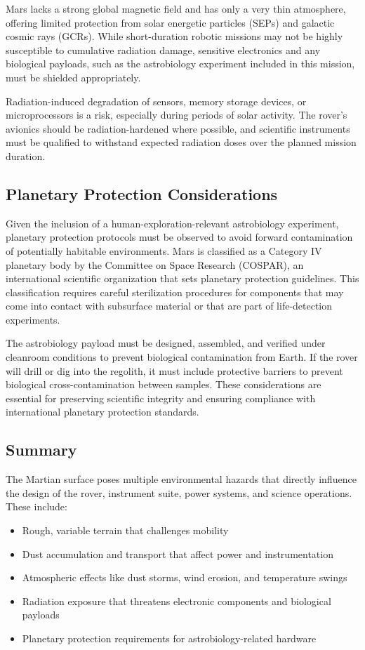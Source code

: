 \documentclass[12pt]{article}
\begin{document}
Mars lacks a strong global magnetic field and has only a very thin atmosphere, offering limited protection from solar energetic particles (SEPs) and galactic cosmic rays (GCRs). While short-duration robotic missions may not be highly susceptible to cumulative radiation damage, sensitive electronics and any biological payloads, such as the astrobiology experiment included in this mission, must be shielded appropriately.

Radiation-induced degradation of sensors, memory storage devices, or microprocessors is a risk, especially during periods of solar activity. The rover’s avionics should be radiation-hardened where possible, and scientific instruments must be qualified to withstand expected radiation doses over the planned mission duration.

\subsection*{Planetary Protection Considerations}

Given the inclusion of a human-exploration-relevant astrobiology experiment, planetary protection protocols must be observed to avoid forward contamination of potentially habitable environments. Mars is classified as a Category IV planetary body by the Committee on Space Research (COSPAR), an international scientific organization that sets planetary protection guidelines. This classification requires careful sterilization procedures for components that may come into contact with subsurface material or that are part of life-detection experiments.

The astrobiology payload must be designed, assembled, and verified under cleanroom conditions to prevent biological contamination from Earth. If the rover will drill or dig into the regolith, it must include protective barriers to prevent biological cross-contamination between samples. These considerations are essential for preserving scientific integrity and ensuring compliance with international planetary protection standards.

\subsection*{Summary}

The Martian surface poses multiple environmental hazards that directly influence the design of the rover, instrument suite, power systems, and science operations. These include:
\begin{itemize}
    \item Rough, variable terrain that challenges mobility
    \item Dust accumulation and transport that affect power and instrumentation
    \item Atmospheric effects like dust storms, wind erosion, and temperature swings
    \item Radiation exposure that threatens electronic components and biological payloads
    \item Planetary protection requirements for astrobiology-related hardware
\end{itemize}
\end{document}
